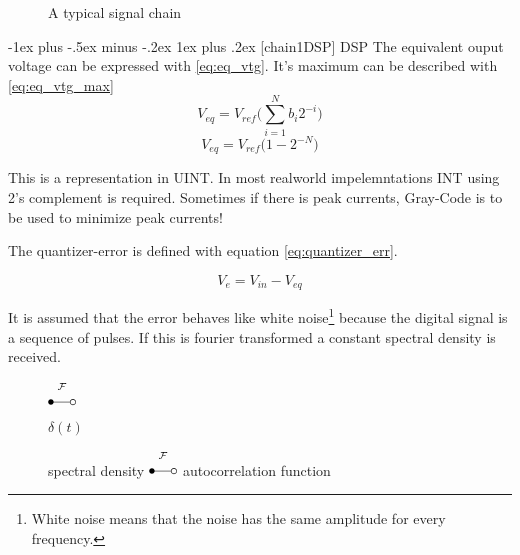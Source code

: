 \documentclass[10pt,landscape]{article}
\makeatletter
\newcommand*\circled[1]{\tikz[baseline=(char.base)]{
            \node[shape=circle,draw,inner sep=2pt] (char) {#1};}}
\renewcommand{\subsubsection}{\@startsection{subsubsection}{3}{0mm}%
                                {-1ex plus -.5ex minus -.2ex}%
                                {1ex plus .2ex}%
                                {\normalfont\small\bfseries}}
\makeatother
\begin{document}
\begin{multicols}{2}
\begin{figure}[H]
\begin{center}
\begin{circuitikz}[x=0.021\linewidth,y=0.021\linewidth]
        \end{circuitikz}
    \end{center}
    \caption{A typical signal chain}
    \label{fig:chain}
\end{figure}

\subsubsection[chain1DSP]{\circled{1} DSP}
The equivalent ouput voltage can be expressed with \ref{eq:eq_vtg}. It's maximum can be described with \ref{eq:eq_vtg_max}
\begin{equation}
    V_{eq} = V_{ref} \Big(\sum^N_{i=1}b_i 2^{-i}\Big)
    \label{eq:eq_vtg}
\end{equation}
\begin{equation}
    V_{eq} = V_{ref}\Big(1 - 2^{-N}\Big)
    \label{eq:eq_vtg_max}
\end{equation}

This is a representation in UINT. In most realworld impelemntations INT using 2's complement is required. Sometimes if there is peak currents, Gray-Code is to be used to minimize peak currents!

The quantizer-error is defined with equation \ref{eq:quantizer_err}.

\begin{equation}
    V_{e} = V_{in} - V_{eq}
    \label{eq:quantizer_err}
\end{equation}

It is assumed that the error behaves like white noise\footnote{White noise means that the noise has the same amplitude for every frequency.} because the digital signal is a sequence of pulses. If this is fourier transformed a constant spectral density is received.

\begin{figure}[H]
    \centering
    \begin{minipage}{0.5\columnwidth}
        \centering
    \end{minipage}%
    \begin{minipage}{0.2\columnwidth}
        $\overset{\mathcal{F}}{\Laplace}$
    \end{minipage}
    \begin{minipage}{0.29\columnwidth}
        $\delta(t)$
    \end{minipage}
    spectral density $\overset{\mathcal{F}}{\Laplace}$ autocorrelation function
\end{figure}


\end{multicols}
\end{document}
